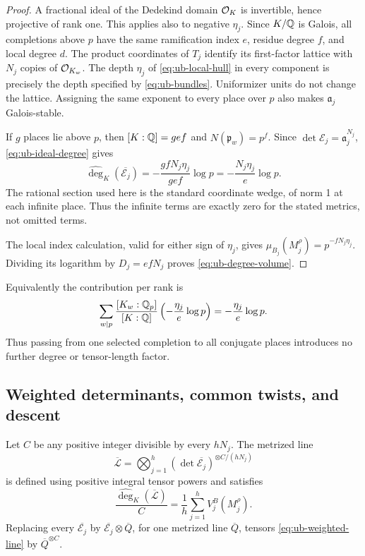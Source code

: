 \begin{proof}
A fractional ideal of the Dedekind domain $\mathcal O_K$ is invertible,
hence projective of rank one. This applies also to negative $\eta_j$.
Since $K/\mathbb Q$ is Galois, all completions above $p$ have the same
ramification index $e$, residue degree $f$, and local degree $d$.
The product coordinates of $T_j$ identify its first-factor lattice
with $N_j$ copies of $\mathcal O_{K_w}$. The depth $\eta_j$ of
\eqref{eq:ub-local-hull} in every component is precisely the depth
specified by \eqref{eq:ub-bundles}. Uniformizer units do not change
the lattice. Assigning the same exponent to every place over $p$
also makes $\mathfrak a_j$ Galois-stable.

If $g$ places lie above $p$, then $[K:\mathbb Q]=gef$ and
$N(\mathfrak p_w)=p^f$. Since
$\det\mathcal E_j=\mathfrak a_j^{N_j}$,
\eqref{eq:ub-ideal-degree} gives
\[
 \widehat{\deg}_K(\overline{\mathcal E_j})
 =-\frac{gfN_j\eta_j}{gef}\log p
 =-\frac{N_j\eta_j}{e}\log p.
\]
The rational section used here is the standard coordinate wedge,
of norm 1 at each infinite place. Thus the infinite terms are
exactly zero for the stated metrics, not omitted terms.

The local index calculation, valid for either sign of $\eta_j$,
gives $\mu_{B_j}(M_j^\rho)=p^{-fN_j\eta_j}$. Dividing its logarithm
by $D_j=efN_j$ proves \eqref{eq:ub-degree-volume}.
\end{proof}

Equivalently the contribution per rank is
\[
 \sum_{w\mid p}\frac{[K_w:\mathbb Q_p]}{[K:\mathbb Q]}
       \left(-\frac{\eta_j}{e}\log p\right)
       =-\frac{\eta_j}{e}\log p.
\]
Thus passing from one selected completion to all conjugate places
introduces no further degree or tensor-length factor.

\subsection{Weighted determinants, common twists, and descent}

\begin{proposition}\label{prop:ub-weighted-determinant}
Let $C$ be any positive integer divisible by every $hN_j$. The
metrized line
\begin{equation}\label{eq:ub-weighted-line}
 \overline{\mathcal L}
 =\bigotimes_{j=1}^h
       (\det\overline{\mathcal E_j})^{\otimes C/(hN_j)}
\end{equation}
is defined using positive integral tensor powers and satisfies
\begin{equation}\label{eq:ub-weighted-degree}
 \frac{\widehat{\deg}_K(\overline{\mathcal L})}{C}
       =\frac1h\sum_{j=1}^h V_j^B(M_j^\rho).
\end{equation}
Replacing every $\overline{\mathcal E_j}$ by
$\overline{\mathcal E_j}\otimes\overline Q$, for one metrized line
$\overline Q$, tensors \eqref{eq:ub-weighted-line} by
$\overline Q^{\otimes C}$.
\end{proposition}

